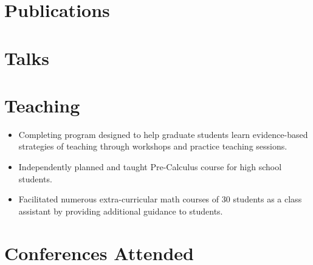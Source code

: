 \documentclass{cultvoucher}
\begin{document}
\section{Publications}

\restoregeometry

\section{Talks}

\section{Teaching}

\begin{itemize}
	\vspace{-0.25em}
	\item Completing program designed to help graduate students learn evidence-based strategies of teaching through workshops and practice teaching sessions.
\end{itemize}

\begin{itemize}
	\vspace{-0.25em}
	\item Independently planned and taught Pre-Calculus course for high school students.
\end{itemize}

\begin{itemize}
	\vspace{-0.25em}
	\item Facilitated numerous extra-curricular math courses of 30 students as a class assistant by providing additional guidance to students.
\end{itemize}

\section{Conferences Attended}

\end{document}
